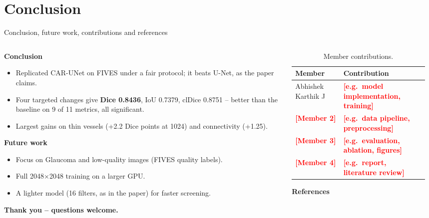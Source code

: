 \documentclass[aspectratio=169,10pt]{beamer}
\newcommand{\fillme}[1]{\textcolor{red}{\textbf{[#1]}}}
\begin{document}
\section{Conclusion}

\begin{frame}{Conclusion, future work, contributions and references}
  \begin{columns}[T]
    \begin{column}{0.49\textwidth}
      \textbf{Conclusion}
      \begin{itemize}\setlength\itemsep{1pt}\scriptsize
        \item Replicated CAR-UNet on FIVES under a fair protocol; it beats U-Net, as the paper claims.
        \item Four targeted changes give \textbf{Dice 0.8436}, IoU 0.7379, clDice 0.8751 -- better than the baseline on 9 of 11 metrics, all significant.
        \item Largest gains on thin vessels (+2.2 Dice points at 1024) and connectivity (+1.25).
      \end{itemize}
      \textbf{Future work}
      \begin{itemize}\setlength\itemsep{1pt}\scriptsize
        \item Focus on Glaucoma and low-quality images (FIVES quality labels).
        \item Full 2048$\times$2048 training on a larger GPU.
        \item A lighter model (16 filters, as in the paper) for faster screening.
      \end{itemize}
      \vspace{4pt}
      {\small\textbf{Thank you -- questions welcome.}}
    \end{column}
    \begin{column}{0.49\textwidth}
      \begin{table}
        \caption{Member contributions.}
        \tiny
        \begin{tabular}{@{}p{0.34\linewidth}p{0.60\linewidth}@{}}
          \toprule
          Member & Contribution \\
          \midrule
          Abhishek Karthik J & \fillme{e.g.\ model implementation, training} \\
          \fillme{Member 2} & \fillme{e.g.\ data pipeline, preprocessing} \\
          \fillme{Member 3} & \fillme{e.g.\ evaluation, ablation, figures} \\
          \fillme{Member 4} & \fillme{e.g.\ report, literature review} \\
          \bottomrule
        \end{tabular}
      \end{table}
      \vspace{-6pt}
      \textbf{\small References}\\[-2pt]
      \tiny
      \nocite{*}
      
      
    \end{column}
  \end{columns}
\end{frame}
\end{document}
